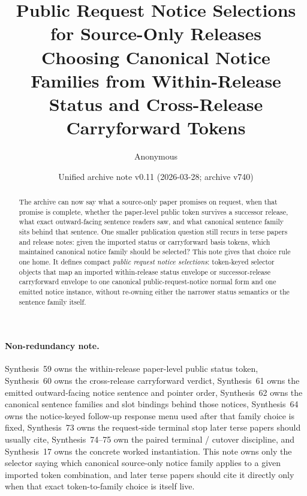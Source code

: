 \documentclass[11pt]{article}
\title{Public Request Notice Selections for Source-Only Releases\\\large Choosing Canonical Notice Families from Within-Release Status and Cross-Release Carryforward Tokens}
\author{Anonymous}
\date{Unified archive note v0.11 (2026-03-28; archive v740)}
\begin{document}
\maketitle

\begin{abstract}
The archive can now say what a source-only paper promises on request, when that promise is complete, whether the paper-level public token survives a successor release, what exact outward-facing sentence readers saw, and what canonical sentence family sits behind that sentence. One smaller publication question still recurs in terse papers and release notes: given the imported status or carryforward basis tokens, which maintained canonical notice family should be selected? This note gives that choice rule one home. It defines compact \emph{public request notice selections}: token-keyed selector objects that map an imported within-release status envelope or successor-release carryforward envelope to one canonical public-request-notice normal form and one emitted notice instance, without re-owning either the narrower status semantics or the sentence family itself.
\end{abstract}

\paragraph{Non-redundancy note.}
Synthesis~59 owns the within-release paper-level public status token, Synthesis~60 owns the cross-release carryforward verdict, Synthesis~61 owns the emitted outward-facing notice sentence and pointer order, Synthesis~62 owns the canonical sentence families and slot bindings behind those notices, Synthesis~64 owns the notice-keyed follow-up response menu used after that family choice is fixed, Synthesis~73 owns the request-side terminal stop later terse papers should usually cite, Synthesis~74--75 own the paired terminal / cutover discipline, and Synthesis~17 owns the concrete worked instantiation.\cite{series:publicrequeststatusenvelopes,series:publicrequestcarryforward,series:publicrequestnotices,series:publicrequestnoticenormalforms,series:publicrequestresponsemenus,series:publicrequestresponsepacketrefreshresponsepacketclosureverdicts,series:pairedterminalcitationdiscipline,series:pairedterminalcutoverrule,series:workedexample}
This note owns only the selector saying which canonical source-only notice family applies to a given imported token combination, and later terse papers should cite it directly only when that exact token-to-family choice is itself live.
\end{document}
